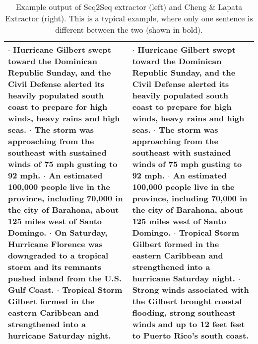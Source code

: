 \begin{table*}[t]
    \footnotesize
\centering
  \begin{tabular}{p{22em} p{22em}}
\toprule
$\cdot$ Hurricane Gilbert swept toward the Dominican Republic Sunday, and the 
   Civil Defense alerted its heavily populated south coast to prepare 
   for high winds, heavy rains and high seas.                         
$\cdot$ The storm was approaching from the southeast with sustained winds of  
   75 mph gusting to 92 mph.                                          
$\cdot$ An estimated 100,000 people live in the province, including 70,000 in 
   the city of Barahona, about 125 miles west of Santo Domingo.       
$\cdot$ \textbf{On Saturday, Hurricane Florence was downgraded to a tropical storm and
   its remnants pushed inland from the U.S. Gulf Coast.}               
$\cdot$ Tropical Storm Gilbert formed in the eastern Caribbean and            
   strengthened into a hurricane Saturday night.  
&
$\cdot$ Hurricane Gilbert swept toward the Dominican Republic Sunday, and the 
   Civil Defense alerted its heavily populated south coast to prepare 
   for high winds, heavy rains and high seas.                         
$\cdot$ The storm was approaching from the southeast with sustained winds of  
   75 mph gusting to 92 mph.                                          
$\cdot$ An estimated 100,000 people live in the province, including 70,000 in 
   the city of Barahona, about 125 miles west of Santo Domingo.       
$\cdot$ Tropical Storm Gilbert formed in the eastern Caribbean and            
   strengthened into a hurricane Saturday night.                      
$\cdot$ \textbf{Strong winds associated with the Gilbert brought coastal flooding,    
   strong southeast winds and up to 12 feet feet to Puerto Rico's     
   south coast.}   \\
\bottomrule
\end{tabular}
\caption{Example output of Seq2Seq extractor (left) and Cheng 
\& Lapata Extractor (right). This is a typical example, where only one
 sentence is different between the two (shown in bold). }
\label{tab:output}
\end{table*}


